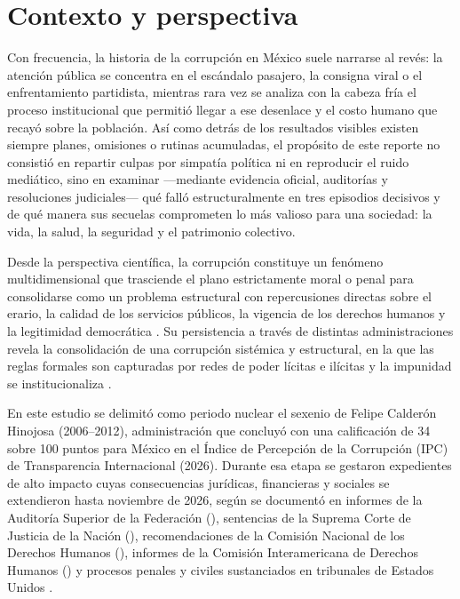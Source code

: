 

\section{Contexto y perspectiva}

Con frecuencia, la historia de la corrupción en México suele narrarse al revés: la atención pública se concentra en el escándalo pasajero, la consigna viral o el enfrentamiento partidista, mientras rara vez se analiza con la cabeza fría el proceso institucional que permitió llegar a ese desenlace y el costo humano que recayó sobre la población. Así como detrás de los resultados visibles existen siempre planes, omisiones o rutinas acumuladas, el propósito de este reporte no consistió en repartir culpas por simpatía política ni en reproducir el ruido mediático, sino en examinar ---mediante evidencia oficial, auditorías y resoluciones judiciales--- qué falló estructuralmente en tres episodios decisivos y de qué manera sus secuelas comprometen lo más valioso para una sociedad: la vida, la salud, la seguridad y el patrimonio colectivo.

Desde la perspectiva científica, la corrupción constituye un fenómeno multidimensional que trasciende el plano estrictamente moral o penal para consolidarse como un problema estructural con repercusiones directas sobre el erario, la calidad de los servicios públicos, la vigencia de los derechos humanos y la legitimidad democrática \citep{inegi2016,monsivais2020,reyesheroles2003}. Su persistencia a través de distintas administraciones revela la consolidación de una corrupción sistémica y estructural, en la que las reglas formales son capturadas por redes de poder lícitas e ilícitas y la impunidad se institucionaliza \citep{casar2024,merino2024,sandoval2024}.

En este estudio se delimitó como periodo nuclear el sexenio de Felipe Calderón Hinojosa (2006--2012), administración que concluyó con una calificación de 34 sobre 100 puntos para México en el Índice de Percepción de la Corrupción (IPC) de Transparencia Internacional (2026). Durante esa etapa se gestaron expedientes de alto impacto cuyas consecuencias jurídicas, financieras y sociales se extendieron hasta noviembre de 2026, según se documentó en informes de la Auditoría Superior de la Federación (), sentencias de la Suprema Corte de Justicia de la Nación (), recomendaciones de la Comisión Nacional de los Derechos Humanos (), informes de la Comisión Interamericana de Derechos Humanos () y procesos penales y civiles sustanciados en tribunales de Estados Unidos \citep{asf2013,asf2015,asf2016,cidh2020,cndh2009,doj2024garcialuna,scjn2010,scjn2025,uif2025,uif2026}.

